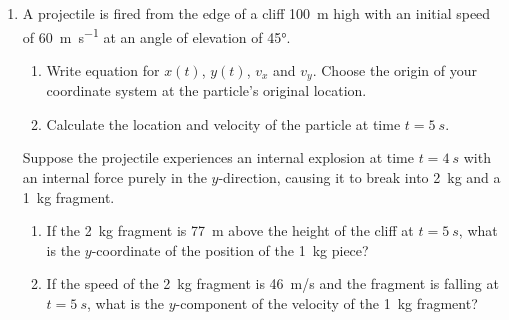 \documentclass{../../oss-apphys}
\begin{document}
\begin{enumerate}[leftmargin=15pt]
\item A projectile is fired from the edge of a cliff \SI{100}{\metre} high with
  an initial speed of \SI{60}{\metre\per\second} at an angle of elevation of
  \ang{45}.
  \begin{enumerate}[noitemsep]
  \item Write equation for $x(t)$, $y(t)$, $v_x$ and $v_y$. Choose the origin of
    your coordinate system at the particle's original location.
    \vspace{1.25in}
  \item Calculate the location and velocity of the particle at time
    $t=\SI{5}{s}$.
    \vspace{1.25in}
  \end{enumerate}
  Suppose the projectile experiences an internal explosion at time $t=\SI{4}{s}$
  with an internal force purely in the $y$-direction, causing it to break into
  \SI{2}{\kg} and a \SI{1}{\kg} fragment.
  \begin{enumerate}
  \item If the \SI{2}{\kg} fragment is \SI{77}{m} above the height of the
    cliff at $t=\SI{5}{s}$, what is the $y$-coordinate of the position of the
    \SI{1}{\kg} piece?
    \vspace{1.25in}
  \item If the speed of the \SI{2}{kg} fragment is \SI{46}{m/s} and the
    fragment is falling at $t=\SI{5}{s}$, what is the $y$-component of the
    velocity of the \SI{1}{kg} fragment?
  \end{enumerate}
  \newpage
  

\end{enumerate}
\end{document}
